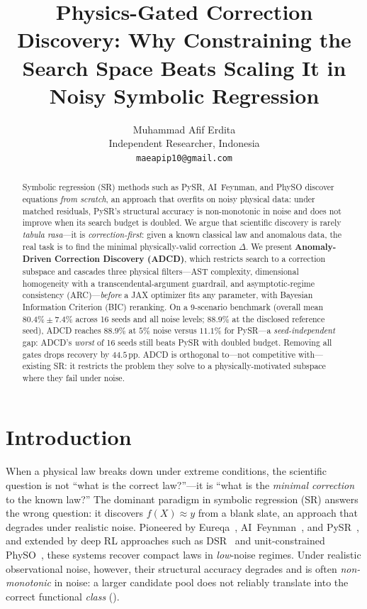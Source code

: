 \documentclass{article}
\title{Physics-Gated Correction Discovery: Why Constraining the Search Space Beats Scaling It in Noisy Symbolic Regression}
\author{%
  Muhammad Afif Erdita \\
  Independent Researcher, Indonesia \\
  \texttt{maeapip10@gmail.com}
}
\begin{document}
\maketitle

\begin{abstract}
Symbolic regression (SR) methods such as PySR, AI~Feynman, and PhySO discover equations \emph{from scratch}, an approach that overfits on noisy physical data: under matched residuals, PySR's structural accuracy is non-monotonic in noise and does not improve when its search budget is doubled. We argue that scientific discovery is rarely \emph{tabula rasa}---it is \emph{correction-first}: given a known classical law and anomalous data, the real task is to find the minimal physically-valid correction $\Delta$. We present \textbf{Anomaly-Driven Correction Discovery (ADCD)}, which restricts search to a correction subspace and cascades three physical filters---AST complexity, dimensional homogeneity with a transcendental-argument guardrail, and asymptotic-regime consistency (ARC)---\emph{before} a JAX optimizer fits any parameter, with Bayesian Information Criterion (BIC) reranking. On a 9-scenario benchmark (overall mean $80.4\%\pm7.4\%$ across 16 seeds and all noise levels; $88.9\%$ at the disclosed reference seed), ADCD reaches $88.9\%$ at $5\%$ noise versus $11.1\%$ for PySR---a \emph{seed-independent} gap: ADCD's \emph{worst} of 16 seeds still beats PySR with doubled budget. Removing all gates drops recovery by $44.5$\,pp. ADCD is orthogonal to---not competitive with---existing SR: it restricts the problem they solve to a physically-motivated subspace where they fail under noise.
\end{abstract}

\section{Introduction}
\label{sec:intro}

When a physical law breaks down under extreme conditions, the scientific question is not ``what is the correct law?''---it is ``what is the \emph{minimal correction} to the known law?'' The dominant paradigm in symbolic regression (SR) answers the wrong question: it discovers $f(X)\approx y$ from a blank slate, an approach that degrades under realistic noise. Pioneered by Eureqa~\cite{schmidt2009distilling}, AI~Feynman~\cite{udrescu2020ai}, and PySR~\cite{cranmer2020pysr}, and extended by deep RL approaches such as DSR~\cite{petersen2021deep} and unit-constrained PhySO~\cite{tenachi2023physo}, these systems recover compact laws in \emph{low}-noise regimes. Under realistic observational noise, however, their structural accuracy degrades and is often \emph{non-monotonic} in noise: a larger candidate pool does not reliably translate into the correct functional \emph{class} ().
\end{document}
